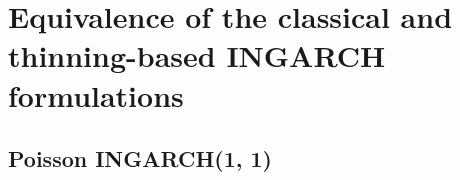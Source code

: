 \documentclass[review]{elsarticle}
\begin{document}
%
%
%
%


\appendix
\section{Equivalence of the classical and thinning-based INGARCH formulations}
\label{appendix:proof}

\subsection{Poisson INGARCH(1, 1)}
\label{subsec:derivation_poisson11}
\end{document}
